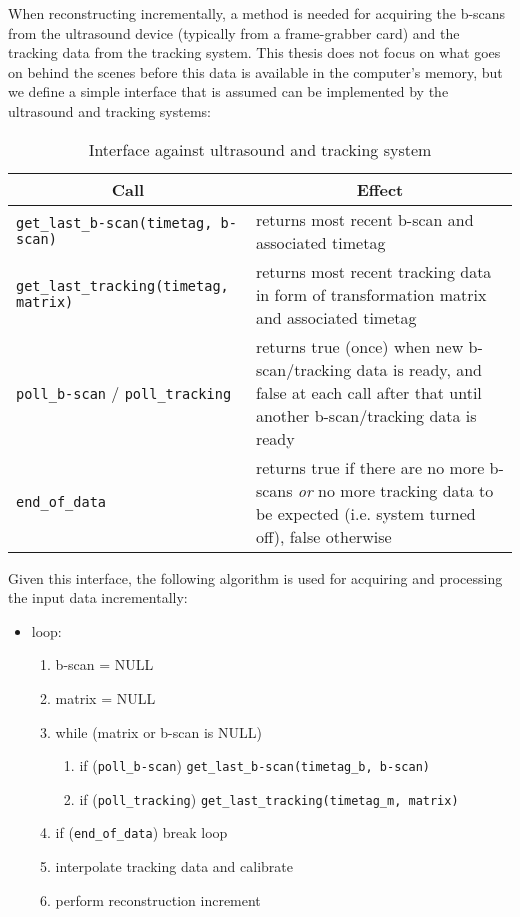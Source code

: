 
When reconstructing incrementally, a method is needed for acquiring the b-scans from the ultrasound device (typically from a frame-grabber card) and the tracking data from the tracking system. This thesis does not focus on what goes on behind the scenes before this data is available in the computer's memory, but we define a simple interface that is assumed can be implemented by the ultrasound and tracking systems:

\begin{table}[h]
\centering
\begin{tabular}{| p{} p{} |}
	\hline
	\multicolumn{1}{|c}{\textbf{Call}} & \multicolumn{1}{c|}{\textbf{Effect}} \\
	\hline
	\hline
	\texttt{get\_last\_b-scan(timetag, b-scan)} & returns most recent b-scan and associated timetag \\
	\texttt{get\_last\_tracking(timetag, matrix)} & returns most recent tracking data in form of transformation matrix and associated timetag \\
	\texttt{poll\_b-scan} / \texttt{poll\_tracking} & returns true (once) when new b-scan/tracking data is ready, and false at each call after that until another b-scan/tracking data is ready \\
	\texttt{end\_of\_data} & returns true if there are no more b-scans \emph{or} no more tracking data to be expected (i.e. system turned off), false otherwise \\
	\hline
\end{tabular}
\caption{Interface against ultrasound and tracking system}
\label{table:ultrasound_interface}
\end{table}

Given this interface, the following algorithm is used for acquiring and processing the input data incrementally:

\begin{itemize}
	\item loop:
	\begin{enumerate}
		\item b-scan = NULL
		\item matrix = NULL
		\item while (matrix or b-scan is NULL)
		\begin{enumerate}
			\item if (\texttt{poll\_b-scan}) \texttt{get\_last\_b-scan(timetag\_b, b-scan)}
			\item if (\texttt{poll\_tracking}) \texttt{get\_last\_tracking(timetag\_m, matrix)}
		\end{enumerate}
		\item if (\texttt{end\_of\_data}) break loop
		\item interpolate tracking data and calibrate
		\item perform reconstruction increment
	\end{enumerate}
\end{itemize}

